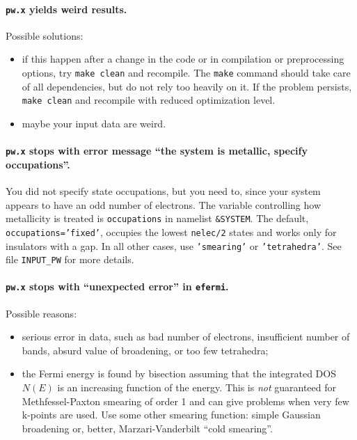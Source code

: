 \documentclass[12pt,a4paper]{article}
\begin{document}
\paragraph{\texttt{pw.x} yields weird results.}

Possible solutions:
\begin{itemize}
  \item
    if this happen after a change in the code or in compilation or
    preprocessing options, try \texttt{make clean} and recompile.
    The \texttt{make} command should take care of all dependencies,
    but do not rely too heavily on it. 
    If the problem persists, \texttt{make clean} and recompile with
    reduced optimization level.
  \item
    maybe your input data are weird.
\end{itemize}

\paragraph{\texttt{pw.x} stops with error message ``the system is
           metallic, specify occupations''.}

You did not specify state occupations, but you need to, since your
system appears to have an odd number of electrons.
The variable controlling how metallicity is treated is
\texttt{occupations} in namelist \texttt{\&SYSTEM}.
The default, \texttt{occupations='fixed'}, occupies the lowest
\texttt{nelec/2} states and works only for insulators with a gap.
In all other cases, use \texttt{'smearing'} or \texttt{'tetrahedra'}.
See file \texttt{INPUT\_PW} for more details.

\paragraph{\texttt{pw.x} stops with ``unexpected error'' in
           \texttt{efermi}.}

Possible reasons:
\begin{itemize}
  \item
    serious error in data, such as bad number of electrons,
    insufficient number of bands, absurd value of broadening, or too
    few tetrahedra;
  \item
    the Fermi energy is found by bisection assuming that the
    integrated DOS $N(E)$ is an increasing function of the energy. 
    This is {\em not} guaranteed for Methfessel-Paxton smearing of
    order 1 and can give problems when very few k-points are used.
    Use some other smearing function: simple Gaussian broadening or,
    better, Marzari-Vanderbilt ``cold smearing''.
\end{itemize}
\end{document}
